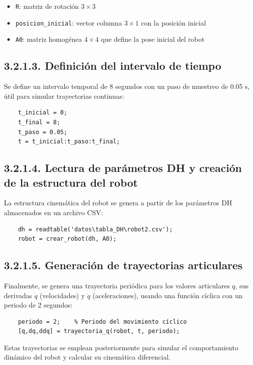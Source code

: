\begin{itemize}
	\item \texttt{R}: matriz de rotación \(3 \times 3\)
	\item \texttt{posicion\_inicial}: vector columna \(3 \times 1\) con la posición inicial
	\item \texttt{A0}: matriz homogénea \(4 \times 4\) que define la pose inicial del robot
\end{itemize}

\subsection*{3.2.1.3. Definición del intervalo de tiempo}

Se define un intervalo temporal de 8 segundos con un paso de muestreo de 0.05 s, útil para simular trayectorias continuas:

\begin{verbatim}
	t_inicial = 0;
	t_final = 8;
	t_paso = 0.05;
	t = t_inicial:t_paso:t_final;
\end{verbatim}

\subsection*{3.2.1.4. Lectura de parámetros DH y creación de la estructura del robot}

La estructura cinemática del robot se genera a partir de los parámetros DH almacenados en un archivo CSV:

\begin{verbatim}
	dh = readtable('datos\tabla_DH\robot2.csv');
	robot = crear_robot(dh, A0);
\end{verbatim}

\subsection*{3.2.1.5. Generación de trayectorias articulares}

Finalmente, se genera una trayectoria periódica para los valores articulares \( q \), sus derivadas \( \dot{q} \) (velocidades) y \( \ddot{q} \) (aceleraciones), usando una función cíclica con un periodo de 2 segundos:

\begin{verbatim}
	periodo = 2;    % Periodo del movimiento cíclico
	[q,dq,ddq] = trayectoria_q(robot, t, periodo);
\end{verbatim}

Estas trayectorias se emplean posteriormente para simular el comportamiento dinámico del robot y calcular su cinemática diferencial.


